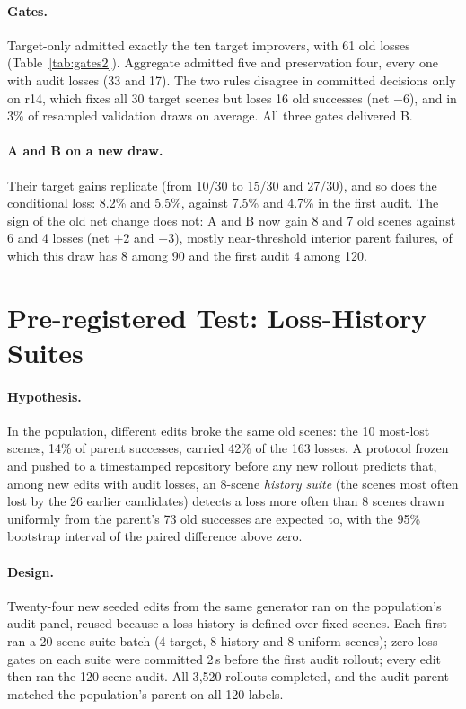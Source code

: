 \documentclass[letterpaper]{article} %
\begin{document}
\paragraph{Gates.} Target-only admitted exactly the ten target improvers, with 61 old losses (Table~\ref{tab:gates2}). Aggregate admitted five and preservation four, every one with audit losses (33 and 17). The two rules disagree in committed decisions only on r14, which fixes all 30 target scenes but loses 16 old successes (net $-6$), and in 3\% of resampled validation draws on average. All three gates delivered B.

\paragraph{A and B on a new draw.} Their target gains replicate (from 10/30 to 15/30 and 27/30), and so does the conditional loss: 8.2\% and 5.5\%, against 7.5\% and 4.7\% in the first audit. The sign of the old net change does not: A and B now gain 8 and 7 old scenes against 6 and 4 losses (net $+2$ and $+3$), mostly near-threshold interior parent failures, of which this draw has 8 among 90 and the first audit 4 among 120.

\section{Pre-registered Test: Loss-History Suites}
\paragraph{Hypothesis.} In the population, different edits broke the same old scenes: the 10 most-lost scenes, 14\% of parent successes, carried 42\% of the 163 losses. A protocol frozen and pushed to a timestamped repository before any new rollout predicts that, among new edits with audit losses, an 8-scene \emph{history suite} (the scenes most often lost by the 26 earlier candidates) detects a loss more often than 8 scenes drawn uniformly from the parent's 73 old successes are expected to, with the 95\% bootstrap interval of the paired difference above zero.

\paragraph{Design.} Twenty-four new seeded edits from the same generator ran on the population's audit panel, reused because a loss history is defined over fixed scenes. Each first ran a 20-scene suite batch (4 target, 8 history and 8 uniform scenes); zero-loss gates on each suite were committed 2\,s before the first audit rollout; every edit then ran the 120-scene audit. All 3{,}520 rollouts completed, and the audit parent matched the population's parent on all 120 labels.
\end{document}
